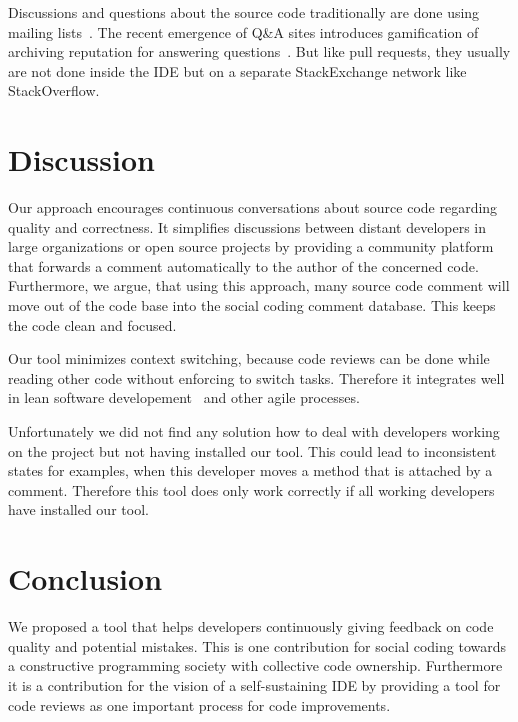 \documentclass[10pt, conference]{IEEEtran}
\begin{document}
%
Discussions and questions about the source code traditionally are done using mailing lists~\cite{vasilescu2014QA}.
%
The recent emergence of Q\&A sites introduces gamification of archiving reputation for answering questions~\cite{vasilescu2014QA}.
%
But like pull requests, they usually are not done inside the IDE but on a separate StackExchange network like StackOverflow.

\section{Discussion}
Our approach encourages continuous conversations about source code regarding quality and correctness. 
%
It simplifies discussions between distant developers in large organizations or open source projects by providing a community platform that forwards a comment automatically to the author of the concerned code.
%
Furthermore, we argue, that using this approach, many source code comment will move out of the code base into the social coding comment database. 
%
This keeps the code clean and focused.
%

%
Our tool minimizes context switching, because code reviews can be done while reading other code without enforcing to switch tasks. 
%
Therefore it integrates well in lean software developement~\cite{poppendieck2003lean} and other agile processes. 
%

%
Unfortunately we did not find any solution how to deal with developers working on the project but not having installed our tool. 
%
This could lead to inconsistent states for examples, when this developer moves a method that is attached by a comment. 
%
Therefore this tool does only work correctly if all working developers have installed our tool. 
\section{Conclusion}
We proposed a tool that helps developers continuously giving feedback on code quality and potential mistakes.
%
This is one contribution for social coding towards a constructive programming society with collective code ownership. 
%
Furthermore it is a contribution for the vision of a self-sustaining IDE by providing a tool for code reviews as one important process for code improvements. 
\end{document}

